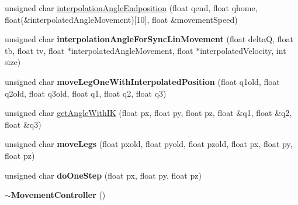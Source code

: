 \begin{Indent}
\begin{DoxyCompactItemize}
\item 
unsigned char \mbox{\hyperlink{class_movement_controller_a53b401947106872656c4fb1e77b04bba}{interpolation\+Angle\+Endposition}} (float qend, float qhome, float(\&interpolated\+Angle\+Movement)\mbox{[}10\mbox{]}, float \&movement\+Speed)
\item 
\mbox{\label{class_movement_controller_a12ad030f9459004052685722bc56acfb}} 
unsigned char {\bfseries interpolation\+Angle\+For\+Sync\+Lin\+Movement} (float deltaQ, float tb, float tv, float $\ast$interpolated\+Angle\+Movement, float $\ast$interpolated\+Velocity, int size)
\item 
\mbox{\label{class_movement_controller_ae58ec5af97b9f1c65c375a779c77cd16}} 
unsigned char {\bfseries move\+Leg\+One\+With\+Interpolated\+Position} (float q1old, float q2old, float q3old, float q1, float q2, float q3)
\item 
unsigned char \mbox{\hyperlink{class_movement_controller_a53d19d2516a2ed440c2b15fc47ea91b7}{get\+Angle\+With\+IK}} (float px, float py, float pz, float \&q1, float \&q2, float \&q3)
\item 
\mbox{\label{class_movement_controller_a60394fc92c5874689cb4108f0d67a66a}} 
unsigned char {\bfseries move\+Legs} (float pxold, float pyold, float pzold, float px, float py, float pz)
\item 
\mbox{\label{class_movement_controller_a0d83341f49565d8ddf9f08e80ffed7a3}} 
unsigned char {\bfseries do\+One\+Step} (float px, float py, float pz)
\item 
\mbox{\label{class_movement_controller_a820b51c9a23a4a363274bc28c5393295}} 
{\bfseries $\sim$\+Movement\+Controller} ()
\end{DoxyCompactItemize}
\end{Indent}
